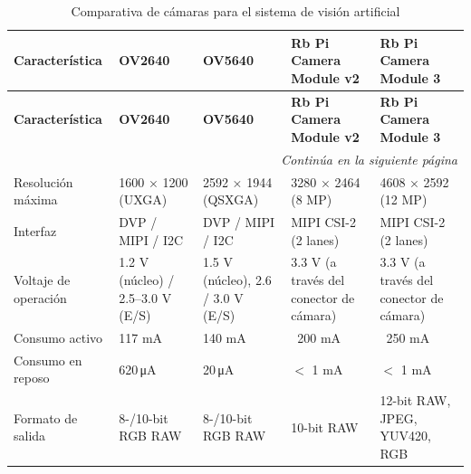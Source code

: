 \renewcommand{\arraystretch}{1.5}
\begin{longtable}{
    |p{2.9cm}
    |p{2.9cm}
    |p{2.9cm}
    |p{2.9cm}
    |p{2.9cm}|
}
\caption{Comparativa de cámaras para el sistema de visión artificial} 
\label{tab:cam_comparativa} \\
\hline
\textbf{Característica} & \textbf{OV2640} & \textbf{OV5640} & \textbf{Rb Pi Camera Module v2} & \textbf{Rb Pi Camera Module 3} \\
\hline
\endfirsthead

\hline
\textbf{Característica} & \textbf{OV2640} & \textbf{OV5640} & \textbf{Rb Pi Camera Module v2} & \textbf{Rb Pi Camera Module 3} \\
\hline
\endhead

\hline
\multicolumn{5}{r}{\textit{Continúa en la siguiente página}} \\
\endfoot

\hline
\endlastfoot

Resolución máxima 
    & 1600 × 1200 (UXGA) 
    & 2592 × 1944 (QSXGA) 
    & 3280 × 2464 (8 MP) 
    & 4608 × 2592 (12 MP) \\ \hline

Interfaz 
    & DVP / MIPI / I2C  
    & DVP / MIPI / I2C 
    & MIPI CSI-2 (2 lanes) 
    & MIPI CSI-2 (2 lanes) \\ \hline

Voltaje de operación 
    & 1.2 V (núcleo) / 2.5--3.0 V (E/S) 
    & 1.5 V (núcleo), 2.6 / 3.0 V (E/S) 
    & 3.3 V (a través del conector de cámara) 
    & 3.3 V (a través del conector de cámara) \\ \hline

Consumo activo 
    & 117 mA 
    & 140 mA
    & ~200 mA  
    & ~250 mA  \\ \hline

Consumo en reposo 
    & 620\,\unit{\micro\ampere} 
    & 20\,\unit{\micro\ampere} 
    & $<$ 1 mA 
    & $<$ 1 mA \\ \hline

Formato de salida 
    & 8-/10-bit RGB RAW 
    & 8-/10-bit RGB RAW 
    & 10-bit RAW 
    & 12-bit RAW, JPEG, YUV420, RGB \\ \hline


\end{longtable}
